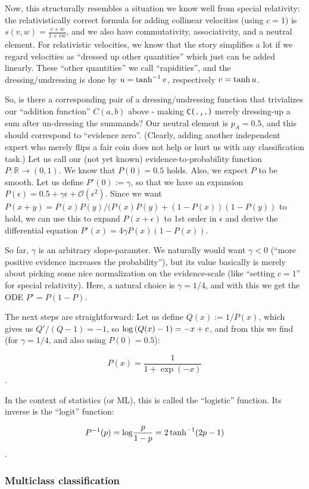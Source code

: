 \documentclass[11pt]{article}
\def\lt{<}
\begin{document}
Now, this structurally resembles a situation we know well from special
relativity: the relativistically correct formula for adding collinear
velocities (using \(c=1\)) is \(s(v, w)=\frac{v+w}{1+vw}\), and we also
have commutativity, associativity, and a neutral element. For
relativistic velocities, we know that the story simplifies a lot if we
regard velocities as ``dressed up other quantities'' which just can be
added linearly. These ``other quantities'' we call ``rapidities'', and
the dressing/undressing is done by \(u={\rm tanh}^{-1}\,v\),
respectively \(v={\rm tanh}\,u\).

So, is there a corresponding pair of a dressing/undressing function that
trivializes our ``addition function'' \(C(a, b)\) above - making
\texttt{C(.,.)} merely dressing-up a sum after un-dressing the summands?
Our neutral element is \(p_A=0.5\), and this should correspond to
``evidence zero''. (Clearly, adding another independent expert who
merely flips a fair coin does not help or hurt us with any
classification task.) Let us call our (not yet known)
evidence-to-probability function \(P:{\mathbb R}\to(0, 1)\). We know
that \(P(0)=0.5\) holds. Also, we expect \(P\) to be smooth. Let us
define \(P'(0):=\gamma\), so that we have an expansion
\(P(\epsilon)=0.5+\gamma \epsilon+{\mathcal O}(\epsilon^2)\). Since we
want \(P(x+y)=P(x)P(y)/(P(x)P(y)+(1-P(x))(1-P(y))\) to hold, we can use
this to expand \(P(x+\epsilon)\) to 1st order in \(\epsilon\) and derive
the differential equation \(P'(x)=4\gamma P(x)(1-P(x))\).

So far, \(\gamma\) is an arbitrary slope-paramter. We naturally would
want \(\gamma\lt 0\) (``more positive evidence increases the
probability''), but its value basically is merely about picking some
nice normalization on the evidence-scale (like ``setting \(c=1\)'' for
special relativity). Here, a natural choice is \(\gamma=1/4\), and with
this we get the ODE \(P'=P(1-P)\).

The next steps are straightforward: Let us define \(Q(x):=1/P(x)\),
which gives us \(Q'/(Q-1)=-1\), so \({\rm log}\,(Q(x)-1)=-x+c\), and
from this we find (for \(\gamma=1/4\), and also using \(P(0)=0.5\)):

\[P(x)=\frac{1}{1+\exp(-x)}\].

In the context of statistics (or ML), this is called the ``logistic''
function. Its inverse is the ``logit'' function:

\[P^{-1}(p)={\rm log}\frac{p}{1-p}=2\,{\rm tanh}^{-1}(2p-1)\].

    \hypertarget{multiclass-classification}{%
\subsubsection{Multiclass
classification}\label{multiclass-classification}}
\end{document}
